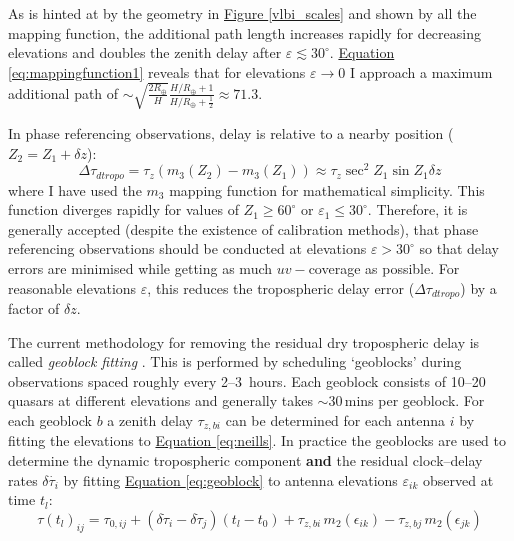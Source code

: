 		As is hinted at by the geometry in \hyperref[vlbi_scales]{Figure \ref*{vlbi_scales}} and shown by all the mapping function, the additional path length increases rapidly for decreasing elevations and doubles the zenith delay after $\varepsilon\lesssim30^\circ$. \hyperref[eq:mappingfunction1]{Equation \ref*{eq:mappingfunction1}} reveals that for elevations $\varepsilon\rightarrow0$ I approach a maximum additional path of $\sim \sqrt{\frac{2R_\oplus}{H}}\frac{H/R_\oplus+1}{H/R_\oplus+\frac{1}{2}}\approx71.3$. %
		
		In phase referencing observations, delay is relative to a nearby position ($Z_2 = Z_1 + \delta z$):
		\begin{equation}
		\Delta\tau_{dtropo} = \tau_z (m_3(Z_2) - m_3(Z_1)) \approx \tau_z\sec^2 Z_1 \sin Z_1 \delta z
		\label{eq:dtropo_zenitherror}
		\end{equation} where I have used the $m_3$ mapping function for mathematical simplicity. This function diverges rapidly for values of $Z_1\ge60^\circ$ or $\varepsilon_1\le30^\circ$. Therefore, it is generally accepted (despite the existence of calibration methods), that phase referencing observations should be conducted at elevations $\varepsilon>30^\circ$ so that delay errors are minimised while getting as much $uv-$coverage as possible. For reasonable elevations $\varepsilon$, this reduces the tropospheric delay error ($\Delta\tau_{dtropo}$) by a factor of $\delta z$.
		
		The current methodology for removing the residual dry tropospheric delay is called {\it geoblock fitting} \citep{Reid2009}. This is performed by scheduling `geoblocks' during observations spaced roughly every 2--3~hours. Each geoblock consists of 10--20 quasars at different elevations and generally takes $\sim30$\,mins per geoblock. For each geoblock $b$ a zenith delay $\tau_{z,bi}$ can be determined for each antenna $i$ by fitting the elevations to \hyperref[eq:neills]{Equation \ref*{eq:neills}}. In practice the geoblocks are used to determine the dynamic tropospheric component {\bf and} the residual clock--delay rates $\delta\dot{\tau_i}$ by fitting \hyperref[eq:geoblock]{Equation \ref*{eq:geoblock}} to antenna elevations $\varepsilon_{ik}$ observed at time $t_l$:
		\begin{equation}
			\tau(t_l)_{ij} = \tau_{0,ij} + (\delta\dot\tau_i-\delta\dot\tau_j)(t_l-t_0) + \tau_{z,bi}\,m_2(\epsilon_{ik}) - \tau_{z,bj}\,m_2(\epsilon_{jk})
			\label{eq:geoblock}
		\end{equation}
				
